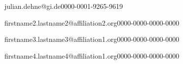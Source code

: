 \author[1]{Julian Dehne}{julian.dehne@gi.de}{0000-0001-9265-9619}
\author[2]{Firstname2 Lastname2}{firstname2.lastname2@affiliation2.org}{0000-0000-0000-0000}
\author[3]{Firstname3 Lastname3}{firstname3.lastname3@affiliation1.org}{0000-0000-0000-0000}
\author[1]{Firstname4 Lastname4}{firstname4.lastname4@affiliation1.org}{0000-0000-0000-0000}%
